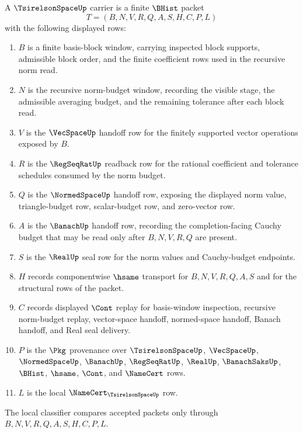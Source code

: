\begin{definition}
\label{def:tsirelson-space-carrier}
A $\TsirelsonSpaceUp$ carrier is a finite $\BHist$ packet
$$
T=(B,N,V,R,Q,A,S,H,C,P,L)
$$
with the following displayed rows:
\begin{enumerate}
\item $B$ is a finite basis-block window, carrying inspected block supports, admissible block order, and the finite coefficient rows used in the recursive norm read.
\item $N$ is the recursive norm-budget window, recording the visible stage, the admissible averaging budget, and the remaining tolerance after each block read.
\item $V$ is the $\VecSpaceUp$ handoff row for the finitely supported vector operations exposed by $B$.
\item $R$ is the $\RegSeqRatUp$ readback row for the rational coefficient and tolerance schedules consumed by the norm budget.
\item $Q$ is the $\NormedSpaceUp$ handoff row, exposing the displayed norm value, triangle-budget row, scalar-budget row, and zero-vector row.
\item $A$ is the $\BanachUp$ handoff row, recording the completion-facing Cauchy budget that may be read only after $B,N,V,R,Q$ are present.
\item $S$ is the $\RealUp$ seal row for the norm values and Cauchy-budget endpoints.
\item $H$ records componentwise $\hsame$ transport for $B,N,V,R,Q,A,S$ and for the structural rows of the packet.
\item $C$ records displayed $\Cont$ replay for basis-window inspection, recursive norm-budget replay, vector-space handoff, normed-space handoff, Banach handoff, and Real seal delivery.
\item $P$ is the $\Pkg$ provenance over $\TsirelsonSpaceUp$, $\VecSpaceUp$, $\NormedSpaceUp$, $\BanachUp$, $\RegSeqRatUp$, $\RealUp$, $\BanachSaksUp$, $\BHist$, $\hsame$, $\Cont$, and $\NameCert$ rows.
\item $L$ is the local $\NameCert_{\TsirelsonSpaceUp}$ row.
\end{enumerate}
The local classifier compares accepted packets only through $B,N,V,R,Q,A,S,H,C,P,L$.
\end{definition}


